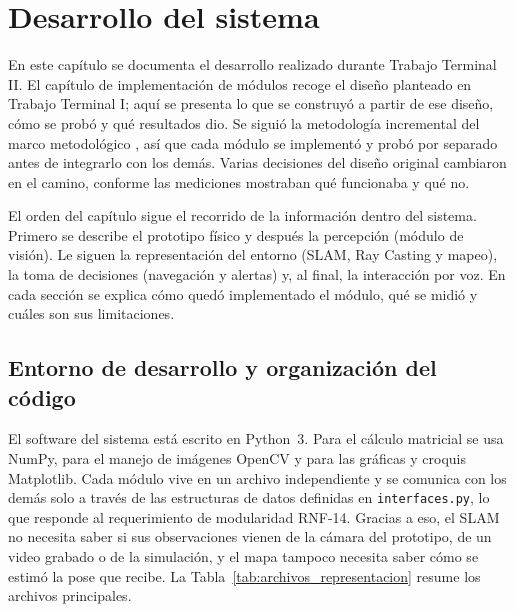 \chapter{Desarrollo del sistema}
\label{cap:desarrollo}

En este capítulo se documenta el desarrollo realizado durante Trabajo Terminal II. El
capítulo de implementación de módulos recoge el diseño planteado en Trabajo Terminal I;
aquí se presenta lo que se construyó a partir de ese diseño, cómo se probó y qué
resultados dio. Se siguió la metodología incremental del marco metodológico
\cite{sommerville2011software}, así que cada módulo se implementó y probó por separado
antes de integrarlo con los demás. Varias decisiones del diseño original cambiaron en
el camino, conforme las mediciones mostraban qué funcionaba y qué no.

El orden del capítulo sigue el recorrido de la información dentro del sistema. Primero
se describe el prototipo físico y después la percepción (módulo de visión). Le siguen la
representación del entorno (SLAM, Ray Casting y mapeo), la toma de decisiones
(navegación y alertas) y, al final, la interacción por voz. En cada sección se explica
cómo quedó implementado el módulo, qué se midió y cuáles son sus limitaciones.

\section{Entorno de desarrollo y organización del código}

El software del sistema está escrito en Python~3. Para el cálculo matricial se usa
NumPy, para el manejo de imágenes OpenCV y para las gráficas y croquis Matplotlib. Cada
módulo vive en un archivo independiente y se comunica con los demás solo a través de
las estructuras de datos definidas en \texttt{interfaces.py}, lo que responde al
requerimiento de modularidad RNF-14. Gracias a eso, el SLAM no necesita saber si sus
observaciones vienen de la cámara del prototipo, de un video grabado o de la
simulación, y el mapa tampoco necesita saber cómo se estimó la pose que recibe. La
Tabla~\ref{tab:archivos_representacion} resume los archivos principales.

